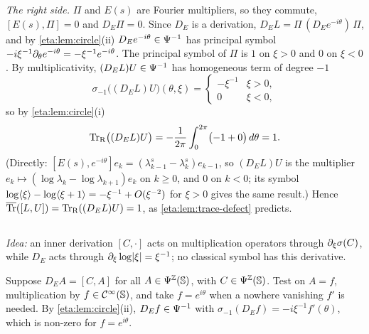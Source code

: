 \emph{The right side.} $\Pi$ and $E(s)$ are Fourier multipliers, so they commute,
$[E(s),\Pi]=0$ and $D_E\Pi=0$. Since $D_E$ is a derivation,
$D_EL=\Pi\,(D_Ee^{-i\theta})\,\Pi$, and by \cref{eta:lem:circle}(ii)
$D_Ee^{-i\theta}\in\Psi^{-1}$ has principal symbol $-i\xi^{-1}\partial_\theta e^{-i\theta}
=-\xi^{-1}e^{-i\theta}$. The principal symbol of $\Pi$ is $1$ on $\xi>0$ and $0$ on
$\xi<0$. By multiplicativity, $(D_EL)U\in\Psi^{-1}$ has homogeneous term of degree
$-1$
\begin{equation*}
  \sigma_{-1}\bigl((D_EL)U\bigr)(\theta,\xi)=\begin{cases}-\xi^{-1}&\xi>0,\\0&\xi<0,\end{cases}
\end{equation*}
so by \cref{eta:lem:circle}(i)
\begin{equation*}
  \operatorname{Tr}_{\mathrm{R}}\bigl((D_EL)U\bigr)=-\frac1{2\pi}\int_0^{2\pi}\bigl(-1+0\bigr)\,d\theta=1 .
\end{equation*}
(Directly: $[E(s),e^{-i\theta}]e_k=(\lambda_{k-1}^s-\lambda_k^s)e_{k-1}$, so
$(D_EL)U$ is the multiplier $e_k\mapsto(\log\lambda_k-\log\lambda_{k+1})e_k$ on
$k\ge0$, and $0$ on $k<0$; its symbol $\log\langle \xi\rangle-\log\langle \xi+1\rangle=-\xi^{-1}+O(\xi^{-2})$
for $\xi>0$ gives the same result.) Hence
$\overline{\operatorname{Tr}}([L,U])=\operatorname{Tr}_{\mathrm{R}}((D_EL)U)=1$, as \cref{eta:lem:trace-defect} predicts.

\subsection*{}

\emph{Idea:} an inner derivation $[C,\cdot]$ acts on multiplication operators
through $\partial_\xi\sigma(C)$, while $D_E$ acts through $\partial_\xi\log\lvert \xi\rvert=\xi^{-1}$;
no classical symbol has this derivative.

Suppose $D_EA=[C,A]$ for all $A\in\Psi^{\mathbb{Z}}(\mathbb{S})$, with $C\in\Psi^{\mathbb{Z}}(\mathbb{S})$.
Test on $A=f$, multiplication by $f\in\mathcal{C}^\infty(\mathbb{S})$, and take $f=e^{i\theta}$ when a
nowhere vanishing $f'$ is needed. By \cref{eta:lem:circle}(ii), $D_Ef\in\Psi^{-1}$
with $\sigma_{-1}(D_Ef)=-i\xi^{-1}f'(\theta)$, which is non-zero for $f=e^{i\theta}$.

